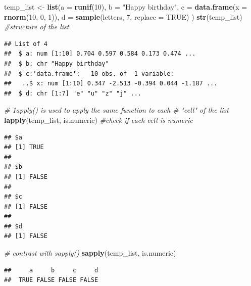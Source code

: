 \documentclass[12pt,]{article}
\newenvironment{Shaded}{\begin{snugshade}}{\end{snugshade}}
\newcommand{\KeywordTok}[1]{\textcolor[rgb]{0.13,0.29,0.53}{\textbf{#1}}}
\newcommand{\DataTypeTok}[1]{\textcolor[rgb]{0.13,0.29,0.53}{#1}}
\newcommand{\DecValTok}[1]{\textcolor[rgb]{0.00,0.00,0.81}{#1}}
\newcommand{\StringTok}[1]{\textcolor[rgb]{0.31,0.60,0.02}{#1}}
\newcommand{\CommentTok}[1]{\textcolor[rgb]{0.56,0.35,0.01}{\textit{#1}}}
\newcommand{\OtherTok}[1]{\textcolor[rgb]{0.56,0.35,0.01}{#1}}
\newcommand{\NormalTok}[1]{#1}
\begin{document}
\begin{Shaded}
\begin{Highlighting}[]
\NormalTok{temp_list <-}\StringTok{ }\KeywordTok{list}\NormalTok{(}\DataTypeTok{a =} \KeywordTok{runif}\NormalTok{(}\DecValTok{10}\NormalTok{),}
                  \DataTypeTok{b =} \StringTok{"Happy birthday"}\NormalTok{,}
                  \DataTypeTok{c =} \KeywordTok{data.frame}\NormalTok{(}\DataTypeTok{x =} \KeywordTok{rnorm}\NormalTok{(}\DecValTok{10}\NormalTok{, }\DecValTok{0}\NormalTok{, }\DecValTok{1}\NormalTok{)),}
                  \DataTypeTok{d =} \KeywordTok{sample}\NormalTok{(letters, }\DecValTok{7}\NormalTok{, }\DataTypeTok{replace =} \OtherTok{TRUE}\NormalTok{)}
\NormalTok{                  )}
\KeywordTok{str}\NormalTok{(temp_list) }\CommentTok{#structure of the list}
\end{Highlighting}
\end{Shaded}

\begin{verbatim}
## List of 4
##  $ a: num [1:10] 0.704 0.597 0.584 0.173 0.474 ...
##  $ b: chr "Happy birthday"
##  $ c:'data.frame':   10 obs. of  1 variable:
##   ..$ x: num [1:10] 0.347 -2.513 -0.394 0.044 -1.187 ...
##  $ d: chr [1:7] "e" "u" "z" "j" ...
\end{verbatim}

\begin{Shaded}
\begin{Highlighting}[]
\CommentTok{# 1apply() is used to apply the same function to each}
\CommentTok{# "cell" of the list}
\KeywordTok{lapply}\NormalTok{(temp_list, is.numeric) }\CommentTok{#check if each cell is numeric}
\end{Highlighting}
\end{Shaded}

\begin{verbatim}
## $a
## [1] TRUE
## 
## $b
## [1] FALSE
## 
## $c
## [1] FALSE
## 
## $d
## [1] FALSE
\end{verbatim}

\begin{Shaded}
\begin{Highlighting}[]
\CommentTok{# contrast with sapply()}
\KeywordTok{sapply}\NormalTok{(temp_list, is.numeric)}
\end{Highlighting}
\end{Shaded}

\begin{verbatim}
##     a     b     c     d 
##  TRUE FALSE FALSE FALSE
\end{verbatim}
\end{document}
